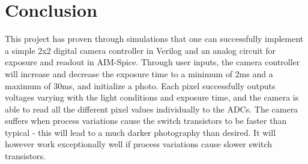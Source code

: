 \section{Conclusion}

This project has proven through simulations that one can successfully implement a simple 2x2 digital camera controller in Verilog and an analog circuit for exposure and readout in AIM-Spice. Through user inputs, the camera controller will increase and decrease the exposure time to a minimum of 2ms and a maximum of 30ms, and initialize a photo. Each pixel successfully outputs voltages varying with the light conditions and exposure time, and the camera is able to read all the different pixel values individually to the ADCs. The camera suffers when process variations cause the switch transistors to be faster than typical - this will lead to a much darker photography than desired. It will however work exceptionally well if process variations cause slower switch transistors.